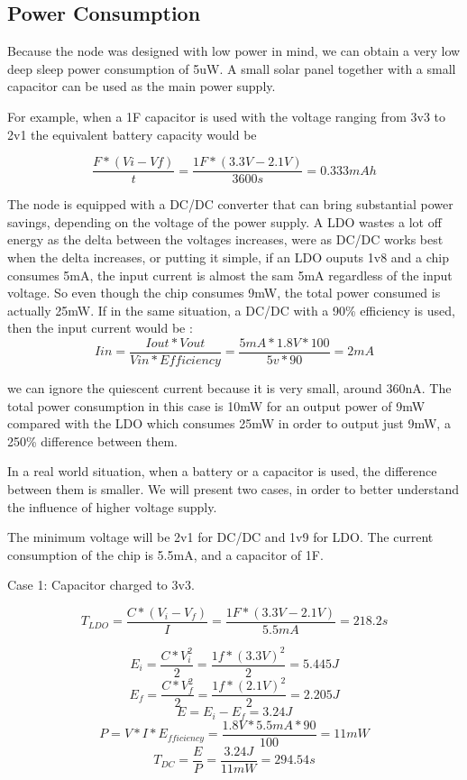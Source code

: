 \label{chap:results}


\subsection{Power Consumption}

Because the node was designed with low power in mind, we can obtain a very low deep sleep power
consumption of 5uW. A small solar panel together with a
small capacitor can be used as the main power supply.

For example, when a 1F capacitor is used with the voltage ranging from 3v3 to 2v1 the equivalent battery capacity would be

$$ \frac{F * (Vi - Vf)}{t} = \frac{1F * (3.3V - 2.1V)}{3600s} = 0.333mAh$$

The node is equipped with a DC/DC converter that can bring substantial power savings, depending on
the voltage of the power supply. A LDO wastes a lot off energy as the delta between the
voltages increases, were as DC/DC works best when the delta increases, or putting it simple, if an
LDO ouputs 1v8 and a chip consumes 5mA, the input current is almost the sam 5mA regardless of the
input voltage. So even though the chip consumes 9mW, the total power consumed is actually 25mW. If
in the same situation, a DC/DC with a 90\% efficiency is used, then the input current would be :
$$Iin = \frac{Iout * Vout}{Vin*Efficiency} = \frac{5mA * 1.8V*100}{5v*90}= 2mA$$


we can ignore the quiescent current because it is very small, around 360nA. The total power
consumption in this case is 10mW for an output power of 9mW compared with the LDO which consumes
25mW in order to output just 9mW, a 250\% difference between them.

In a real world situation, when a battery or a capacitor is used, the difference between them is
smaller. We will present two cases, in order to better understand the influence of higher
voltage supply.

The minimum voltage will be 2v1 for DC/DC and 1v9 for LDO. The current consumption of the chip is
5.5mA, and a capacitor of 1F.

Case 1: Capacitor charged to 3v3.

$$T_{LDO} = \frac{C * (V_i - V_f)}{I}=\frac{1F * (3.3V - 2.1V)}{5.5mA} = 218.2s $$

$$E_i = \frac{C*V_i^2}{2} = \frac{1f*(3.3V)^2}{2} =5.445J$$
$$E_f = \frac{C*V_f^2}{2} = \frac{1f*(2.1V)^2}{2} =2.205J$$
$$E = E_i - E_f = 3.24J$$
$$P = V*I*E_{fficiency }= \frac{1.8V * 5.5mA * 90}{100} = 11mW$$
$$T_{DC} = \frac{E}{P} = \frac{3.24J}{11mW} =294.54s $$

